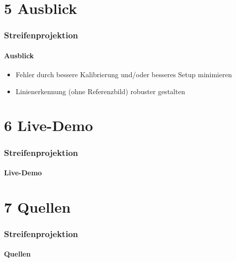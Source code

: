 \documentclass{beamer}
\begin{document}
\section{5 \hspace{5px} Ausblick}

\begin{frame}
	\frametitle{Streifenprojektion}
	\framesubtitle{Ausblick}

	\begin{itemize}
		\item Fehler durch bessere Kalibrierung und/oder besseres Setup minimieren
		\item Linienerkennung (ohne Referenzbild) robuster gestalten
	\end{itemize}

\end{frame}


\section{6 \hspace{5px} Live-Demo} 
\begin{frame}
	\frametitle{Streifenprojektion}
	\framesubtitle{Live-Demo}

\end{frame}


\section{7 \hspace{5px} Quellen} 
\begin{frame}
	\frametitle{Streifenprojektion}
	\framesubtitle{Quellen}
	
\end{frame}
\end{document}
